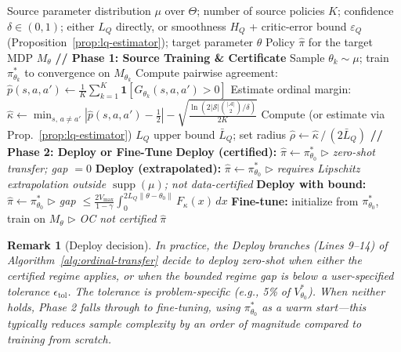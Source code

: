 \documentclass{article}
\newtheorem{remark}{Remark}
\newcommand{\ind}{\mathbf{1}}
\newcommand{\cS}{\mathcal{S}}
\newcommand{\cA}{\mathcal{A}}
\newcommand{\Vmax}{V_{\max}}
\begin{document}
\begin{algorithm}[h]
\caption{Ordinal Transfer: Deploy or Fine-Tune}
\label{alg:ordinal-transfer}
\begin{algorithmic}[1]
\REQUIRE Source parameter distribution $\mu$ over $\Theta$; number of source policies $K$; confidence $\delta \in (0,1)$; either $L_Q$ directly, or smoothness $H_Q$ + critic-error bound $\varepsilon_Q$ (Proposition~\ref{prop:lq-estimator}); target parameter $\theta$
\ENSURE Policy $\hat{\pi}$ for the target MDP $M_\theta$
\STATE \textbf{// Phase 1: Source Training \& Certificate}
  \STATE Sample $\theta_k \sim \mu$; train $\pi^*_{\theta_k}$ to convergence on $M_{\theta_k}$
\ENDFOR
\STATE Compute pairwise agreement: $\hat{p}(s, a, a') \leftarrow \frac{1}{K}\sum_{k=1}^K \ind[G_{\theta_k}(s,a,a') > 0]$
\STATE Estimate ordinal margin: $\hat{\kappa} \leftarrow \min_{s,\, a \neq a'} |\hat{p}(s,a,a') - \tfrac{1}{2}| - \sqrt{\frac{\ln(2|\cS|\binom{|\cA|}{2}/\delta)}{2K}}$
\STATE Compute (or estimate via Prop.~\ref{prop:lq-estimator}) $L_Q$ upper bound $\bar L_Q$; set radius $\hat{\rho} \leftarrow \hat{\kappa}\, /\, (2\bar L_Q)$
\STATE \textbf{// Phase 2: Deploy or Fine-Tune}
  \STATE \textbf{Deploy (certified):} $\hat{\pi} \leftarrow \pi^*_{\theta_0}$ \hfill $\triangleright$ \emph{zero-shot transfer; gap $= 0$}
  \STATE \textbf{Deploy (extrapolated):} $\hat{\pi} \leftarrow \pi^*_{\theta_0}$ \hfill $\triangleright$ \emph{requires Lipschitz extrapolation outside $\operatorname{supp}(\mu)$; not data-certified}
  \STATE \textbf{Deploy with bound:} $\hat{\pi} \leftarrow \pi^*_{\theta_0}$  \hfill $\triangleright$ \emph{gap $\leq \frac{2\Vmax}{1-\gamma} \int_0^{2L_Q\|\theta-\theta_0\|} F_\kappa(x)\, dx$}
\ELSE
  \STATE \textbf{Fine-tune:} initialize from $\pi^*_{\theta_0}$, train on $M_\theta$ \hfill $\triangleright$ \emph{OC not certified}
\ENDIF
\RETURN $\hat{\pi}$
\end{algorithmic}
\end{algorithm}

\begin{remark}[Deploy decision]
\label{rem:deploy-decision}
In practice, the Deploy branches (Lines 9--14) of Algorithm~\ref{alg:ordinal-transfer} decide to deploy zero-shot when either the certified regime applies, or when the bounded regime gap is below a user-specified tolerance $\epsilon_{\mathrm{tol}}$. The tolerance is problem-specific (e.g., 5\% of $V^*_{\theta_0}$). When neither holds, Phase 2 falls through to fine-tuning, using $\pi^*_{\theta_0}$ as a warm start---this typically reduces sample complexity by an order of magnitude compared to training from scratch.
\end{remark}
\end{document}
